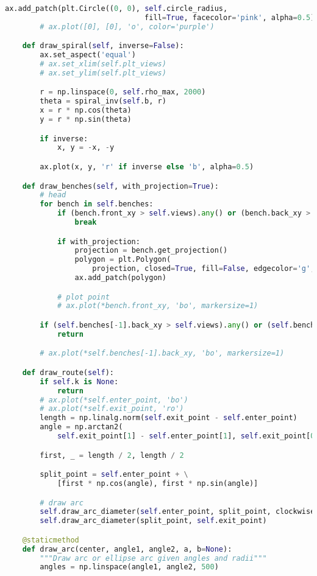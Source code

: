 \begin{lstlisting}[language=python]
        ax.add_patch(plt.Circle((0, 0), self.circle_radius,
                                fill=True, facecolor='pink', alpha=0.5))
        # ax.plot([0], [0], 'o', color='purple')

    def draw_spiral(self, inverse=False):
        ax.set_aspect('equal')
        # ax.set_xlim(self.plt_views)
        # ax.set_ylim(self.plt_views)

        r = np.linspace(0, self.rho_max, 2000)
        theta = spiral_inv(self.b, r)
        x = r * np.cos(theta)
        y = r * np.sin(theta)

        if inverse:
            x, y = -x, -y

        ax.plot(x, y, 'r' if inverse else 'b', alpha=0.5)

    def draw_benches(self, with_projection=True):
        # head
        for bench in self.benches:
            if (bench.front_xy > self.views).any() or (bench.back_xy > self.views).any():
                break

            if with_projection:
                projection = bench.get_projection()
                polygon = plt.Polygon(
                    projection, closed=True, fill=False, edgecolor='g', linewidth=2)
                ax.add_patch(polygon)

            # plot point
            # ax.plot(*bench.front_xy, 'bo', markersize=1)

        if (self.benches[-1].back_xy > self.views).any() or (self.benches[-1].front_xy > self.views).any():
            return

        # ax.plot(*self.benches[-1].back_xy, 'bo', markersize=1)

    def draw_route(self):
        if self.k is None:
            return
        # ax.plot(*self.enter_point, 'bo')
        # ax.plot(*self.exit_point, 'ro')
        length = np.linalg.norm(self.exit_point - self.enter_point)
        angle = np.arctan2(
            self.exit_point[1] - self.enter_point[1], self.exit_point[0] - self.enter_point[0])

        first, _ = length / 2, length / 2

        split_point = self.enter_point + \
            [first * np.cos(angle), first * np.sin(angle)]

        # draw arc
        self.draw_arc_diameter(self.enter_point, split_point, clockwise=True)
        self.draw_arc_diameter(split_point, self.exit_point)

    @staticmethod
    def draw_arc(center, angle1, angle2, a, b=None):
        """Draw arc or ellipse arc given angles and radii"""
        angles = np.linspace(angle1, angle2, 500)


\end{lstlisting}
